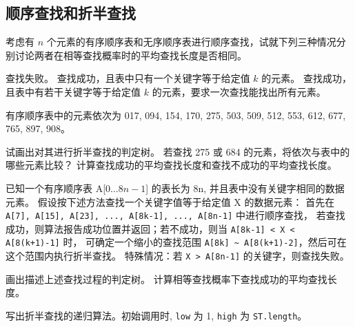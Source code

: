 \subsection{顺序查找和折半查找}

\begin{qitems}
    \begin{bbox}
        \qitem 考虑有 $n$ 个元素的有序顺序表和无序顺序表进行顺序查找，试就下列三种情况分别讨论两者在相等查找概率时的平均查找长度是否相同。
        \begin{subqitems}
            \subqitem 查找失败。
            \subqitem 查找成功，且表中只有一个关键字等于给定值 $k$ 的元素。
            \subqitem 查找成功，且表中有若干关键字等于给定值 $k$ 的元素，要求一次查找能找出所有元素。
        \end{subqitems}
    \end{bbox}

    \begin{bbox}
        \qitem 有序顺序表中的元素依次为 017, 094, 154, 170, 275, 503, 509, 512, 553, 612, 677, 765, 897, 908。
        \begin{subqitems}
            \subqitem 试画出对其进行折半查找的判定树。
            \subqitem 若查找 275 或 684 的元素，将依次与表中的哪些元素比较？
            \subqitem 计算查找成功的平均查找长度和查找不成功的平均查找长度。
        \end{subqitems}
    \end{bbox}

    \begin{bbox}
        \qitem 已知一个有序顺序表 A[$0 \dots 8n-1$] 的表长为 8n, 并且表中没有关键字相同的数据元素。
        假设按下述方法查找一个关键字值等于给定值 X 的数据元素：
        首先在 \lstinline{A[7], A[15], A[23], ..., A[8k-1], ..., A[8n-1]} 中进行顺序查找，
        若查找成功，则算法报告成功位置并返回；若不成功，则当 \lstinline{A[8k-1] < X < A[8(k+1)-1]} 时，
        可确定一个缩小的查找范围 \lstinline{A[8k] ~ A[8(k+1)-2]}，然后可在这个范围内执行折半查找。
        特殊情况：若 \lstinline{X > A[8n-1]} 的关键字，则查找失败。
        \begin{subqitems}
            \subqitem 画出描述上述查找过程的判定树。
            \subqitem 计算相等查找概率下查找成功的平均查找长度。
        \end{subqitems}
    \end{bbox}

    \begin{bbox}
        \qitem 写出折半查找的递归算法。初始调用时, \texttt{low} 为 1, \texttt{high} 为 \texttt{ST.length}。
    \end{bbox}


\end{qitems}
